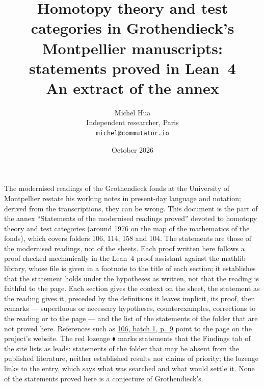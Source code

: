 \documentclass[11pt]{article}
\title{\Large Homotopy theory and test categories in Grothendieck's Montpellier manuscripts: statements proved in Lean~4\\[4pt]
\normalsize An extract of the annex \q{Statements of the modernised readings proved}}
\author{Michel Hua\\ \small Independent researcher, Paris\\ \small \texttt{michel@commutator.io}}
\date{\small October 2026}
\newcommand{\q}[1]{“#1”}
\newcommand{\lot}[3]{\href{https://grothendieck.commutator.io/\##1/#2/p#3}{#1, batch #2, p.~#3}}
\theoremstyle{plain}
\theoremstyle{definition}
\theoremstyle{remark}
\begin{document}
\maketitle

\noindent The modernised readings of the Grothendieck fonds at the University of Montpellier restate his working notes in present-day language and notation; derived from the transcriptions, they can be wrong. This document is the part of the annex \q{Statements of the modernised readings proved} devoted to homotopy theory and test categories (around 1976 on the map of the mathematics of the fonds), which covers folders 106, 114, 158 and 104. The statements are those of the modernised readings, not of the sheets. Each proof written here follows a proof checked mechanically in the Lean~4 proof assistant against the mathlib library, whose file is given in a footnote to the title of each section; it establishes that the statement holds under the hypotheses as written, not that the reading is faithful to the page. Each section gives the context on the sheet, the statement as the reading gives it, preceded by the definitions it leaves implicit, its proof, then remarks --- superfluous or necessary hypotheses, counterexamples, corrections to the reading or to the page --- and the list of the statements of the folder that are not proved here. References such as \lot{106}{1}{9} point to the page on the project's website. The red lozenge \textcolor{piste}{\ensuremath{\blacklozenge}} marks statements that the Findings tab of the site lists as leads: statements of the folder that may be absent from the published literature, neither established results nor claims of priority; the lozenge links to the entry, which says what was searched and what would settle it. None of the statements proved here is a conjecture of Grothendieck's.

\bigskip
\end{document}
